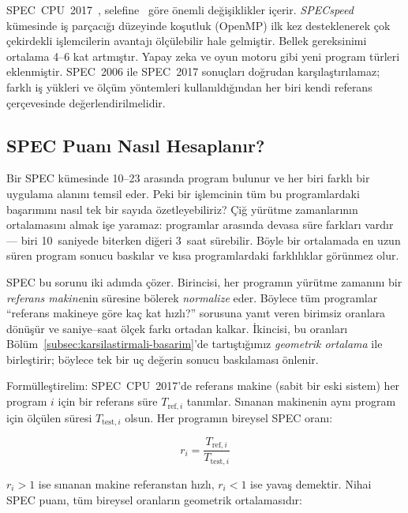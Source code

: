 \begin{bilginot}
SPEC~CPU~2017~\cite{bucek2018}, selefine~\cite{henning2006} göre önemli değişiklikler içerir. \emph{SPECspeed} kümesinde iş parçacığı düzeyinde koşutluk (OpenMP) ilk kez desteklenerek çok çekirdekli işlemcilerin avantajı ölçülebilir hale gelmiştir. Bellek gereksinimi ortalama 4--6 kat artmıştır. Yapay zeka ve oyun motoru gibi yeni program türleri eklenmiştir. SPEC~2006 ile SPEC~2017 sonuçları doğrudan karşılaştırılamaz; farklı iş yükleri ve ölçüm yöntemleri kullanıldığından her biri kendi referans çerçevesinde değerlendirilmelidir.
\end{bilginot}

\subsection{SPEC Puanı Nasıl Hesaplanır?}
\label{subsec:spec-puan-hesaplama}

Bir SPEC kümesinde 10--23 arasında program bulunur ve her biri farklı bir uygulama alanını temsil eder. Peki bir işlemcinin tüm bu programlardaki başarımını nasıl tek bir sayıda özetleyebiliriz? Çiğ yürütme zamanlarının ortalamasını almak işe yaramaz: programlar arasında devasa süre farkları vardır --- biri 10~saniyede biterken diğeri 3~saat sürebilir. Böyle bir ortalamada en uzun süren program sonucu baskılar ve kısa programlardaki farklılıklar görünmez olur.

SPEC bu sorunu iki adımda çözer. Birincisi, her programın yürütme zamanını bir \emph{referans makine}nin süresine bölerek \emph{normalize} eder. Böylece tüm programlar ``referans makineye göre kaç kat hızlı?'' sorusuna yanıt veren birimsiz oranlara dönüşür ve saniye--saat ölçek farkı ortadan kalkar. İkincisi, bu oranları Bölüm~\ref{subsec:karsilastirmali-basarim}'de tartıştığımız \emph{geometrik ortalama} ile birleştirir; böylece tek bir uç değerin sonucu baskılaması önlenir.

Formülleştirelim: SPEC~CPU~2017'de referans makine (sabit bir eski sistem) her program $i$ için bir referans süre $T_{\text{ref},i}$ tanımlar. Sınanan makinenin aynı program için ölçülen süresi $T_{\text{test},i}$ olsun. Her programın bireysel SPEC oranı:

\begin{equation}
r_i = \frac{T_{\text{ref},i}}{T_{\text{test},i}}
\label{eq:spec-oran}
\end{equation}

\noindent $r_i > 1$ ise sınanan makine referanstan hızlı, $r_i < 1$ ise yavaş demektir. Nihai SPEC puanı, tüm bireysel oranların geometrik ortalamasıdır:

